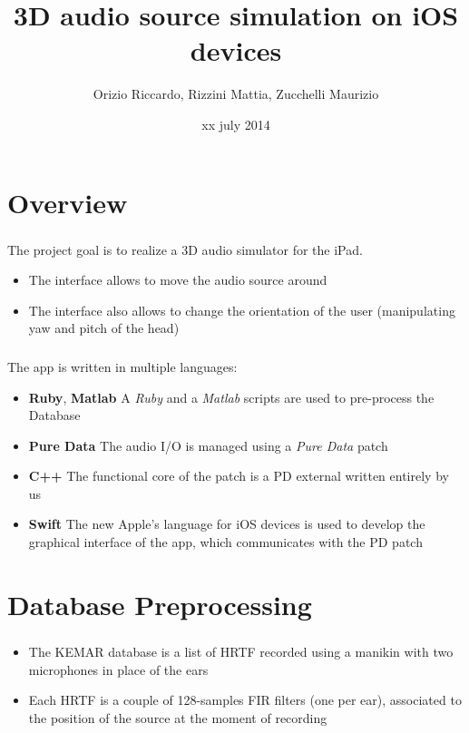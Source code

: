 \documentclass{beamer}
\title{3D audio source simulation on iOS devices}
\author[Orizio, Rizzini, Zucchelli]{Orizio Riccardo, Rizzini Mattia, Zucchelli Maurizio}
\date{xx july 2014}
\institute[UniBS]{University of Brescia}
\begin{document}
	\begin{frame}
		\maketitle
	\end{frame}

	\section{Overview}
	
	\begin{frame}
		\frametitle{\insertsection}
		The project goal is to realize a 3D audio simulator for the iPad.
		\begin{itemize}
			\item The interface allows to move the audio source around
			\item The interface also allows to change the orientation of the user (manipulating yaw
				and pitch of the head)
		\end{itemize}
	\end{frame}

	\begin{frame}
		\frametitle{\insertsection}
		The app is written in multiple languages:
		\begin{itemize}
			\item {\bf Ruby}, {\bf Matlab} A {\em Ruby} and a {\em Matlab} scripts are used to 
				pre-process the Database
			\item {\bf Pure Data} The audio I/O is managed using a {\em Pure Data} patch
			\item {\bf C++} The functional core of the patch is a PD external written entirely
				by us
			\item {\bf Swift} The new Apple's language for iOS devices is used to develop the
				graphical interface of the app, which communicates with the PD patch
		\end{itemize}
	\end{frame}

	\AtBeginSection[]
	{
		\begin{frame}
			\frametitle{Outline}
			\tableofcontents[currentsection]
		\end{frame}
	}

	\section{Database Preprocessing}

	\begin{frame}
		\frametitle{\insertsection}
		\begin{itemize}
			\item The KEMAR database is a list of HRTF recorded using a manikin with two
				microphones in place of the ears
			\item Each HRTF is a couple of 128-samples FIR filters (one per ear), associated to the position
				of the source at the moment of recording
		\end{itemize}
	\end{frame}
\end{document}
